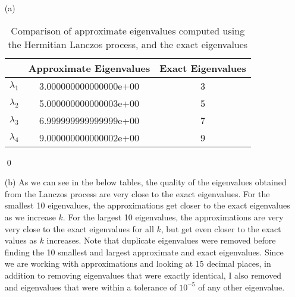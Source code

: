 \documentclass[12pt]{article}
\begin{document}
\begin{itemize}
\item[(a)] \text{ }\\

\begin{table}[H]
\centering
\renewcommand{\arraystretch}{1.5}
\begin{tabular}{| c || c | c |}
\hline
 &  \textbf{Approximate Eigenvalues} & \textbf{Exact Eigenvalues}\\
\hline 
\hline
$\lambda_1$ & 3.000000000000000e+00  &  3 \\
$\lambda_2$ & 5.000000000000003e+00  &  5 \\
$\lambda_3$ & 6.999999999999999e+00  &  7 \\
$\lambda_4$ & 9.000000000000002e+00  &  9 \\
\hline
\end{tabular}
\caption{Comparison of approximate eigenvalues computed using the Hermitian Lanczos process, and the exact eigenvalues}
\end{table} 
\qed\\

\item[(b)] As we can see in the below tables, the quality of the eigenvalues obtained from the Lanczos process are very close to the exact eigenvalues.  For the smallest 10 eigenvalues, the approximations get closer to the exact eigenvalues as we increase $k$.  For the largest 10 eigenvalues, the approximations are very very close to the exact eigenvalues for all $k$, but get even closer to the exact values as $k$ increases.  Note that duplicate eigenvalues were removed before finding the 10 smallest and largest approximate and exact eigenvalues.  Since we are working with approximations and looking at 15 decimal places, in addition to removing eigenvalues that were exactly identical, I also removed and eigenvalues that were within a tolerance of $10^{-5}$ of any other eigenvalue.\\


\end{itemize}
\end{document}
